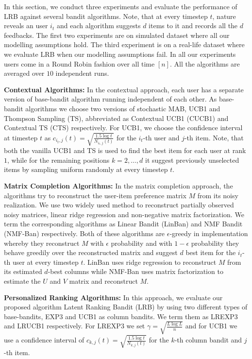In this section, we conduct three experiments and evaluate the performance of LRB against several bandit algorithms. Note, that at every timestep $t$, nature reveals an user $i_t$ and each algorithm suggests $d$ items to it and records all the $d$ feedbacks. The first two experiments are on simulated dataset where all our modelling assumptions hold. The third experiment is on a real-life dataset where we evaluate LRB when our modelling assumptions fail. In all our experiments users come in a Round Robin fashion over all time $[n]$. All the algorithms are averaged over $10$ independent runs.

\textbf{Contextual Algorithms:} In the contextual approach, each user has a separate version of base-bandit algorithm running independent of each other. As base-bandit algorithms we choose two versions of stochastic MAB, UCB1 and Thompson Sampling (TS), abbreviated as Contextual UCB1 (CUCB1) and Contextual TS (CTS) respectively. For UCB1, we choose the confidence interval at timestep $t$ as $c_{i_t, j}(t) = \sqrt{\frac{1.5 \log t}{N_{i_t,j}(t)}}$ for the $i_t$-th user and $j$-th item. Note, that both the vanilla UCB1 and TS is used to find the best item for each user at rank $1$, while for the remaining positions $k= 2,\dots, d$ it  suggest previously unselected items by sampling uniform randomly at every timestep $t$. 

\textbf{Matrix Completion Algorithms:} In the matrix completion approach, the algorithms try to reconstruct the user-item preference matrix $M$ from its noisy realization. We use two widely used method to reconstruct partially observed noisy matrices, linear ridge regression and non-negative matrix factorization. We term the corresponding algorithms as Linear Bandit (LinBan) and NMF Bandit (NMF-Ban) respectively. Both of these algorithms are $\epsilon$-greedy in implementation whereby they reconstruct $M$ with $\epsilon$ probability and with $1-\epsilon$ probability they behave greedily over the reconstructed matrix and suggest $d$ best item for the $i_t$-th user at every timestep $t$. LinBan uses ridge regression to reconstruct $M$ from its estimated $d$-best columns while NMF-Ban uses matrix factorization to estimate the $U$ and $V$ matrix and reconstruct $M$.

\textbf{Personalized Ranking Algorithms:} In this approach, we evaluate our proposed algorithm Latent Ranking Bandit (LRB) by using two different types of base-bandits, EXP3 and UCB1 as column bandits. We term them as LREXP3 and LRUCB1 respectively. For LREXP3 we set $\gamma = \sqrt{\frac{L \log L}{n}}$ and for UCB1 we use  a confidence interval of $c_{k, j}(t) = \sqrt{\frac{1.5 \log t}{N_{k,j}(t)}}$ for the $k$-th column bandit and $j$-th item.

